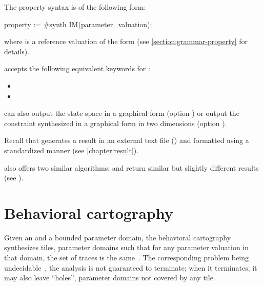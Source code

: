 The property syntax is of the following form:

\begin{IMITATORproperty}
property := #synth IM(parameter_valuation);
\end{IMITATORproperty}

\noindent{}
where  is a reference valuation of the form  (see \cref{section:grammar-property} for details).

\begin{syntaxalias}
	\imitator{} accepts the following equivalent keywords for :
	\begin{itemize}
		\item {}
		\item {}
	\end{itemize}
\end{syntaxalias}


\imitator{} can also output the state space in a graphical form (option )
or
output the constraint synthesized in a graphical form in two dimensions (option ).

Recall that \imitator{} %
generates
a result in an external text file () and formatted using a standardized manner (see \cref{chapter:result}). %


\imitator{} also offers two similar algorithms:  and  return similar but slightly different results (see \cite{AS11}).


\section{Behavioral cartography}\label{ss:mode:BC}

Given an \NIPTA{} and a bounded parameter domain, the behavioral cartography~\BC{} synthesizes tiles, \ie{} parameter domains such that for any parameter valuation in that domain, the set of traces is the same~\cite{AF10}.
The corresponding problem being undecidable~\cite{ALM20}, the analysis is not guaranteed to terminate; when it terminates, it may also leave ``holes'', \ie{} parameter domains not covered by any tile.

